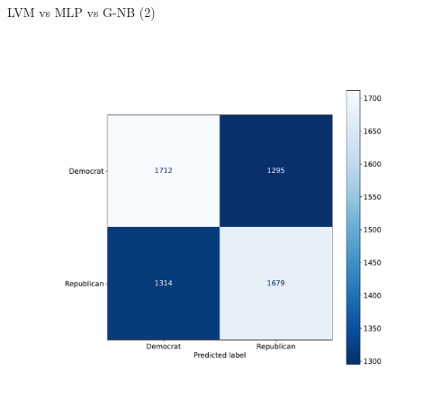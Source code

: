 \documentclass[aspectratio=169,xcolor=dvipsnames]{beamer}
\begin{document}
\begin{frame}{LVM vs MLP vs G-NB (2)}
\begin{columns}
\begin{column}{.7\textwidth}
        \end{column}
        \hspace*{-2cm}
       \begin{column}{.7\textwidth}
            \begin{figure}
                \centering
                \includegraphics[width=.9\linewidth]{images/lvm_summary_130.pdf}
                \label{fig:lvm_summary_130}
            \end{figure}
        \end{column}
    \end{columns}

\end{frame}
\end{document}
